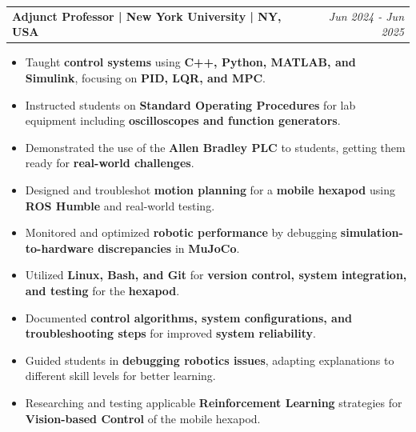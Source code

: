 \documentclass[a4paper,11pt]{article}
\makeatletter
\newcommand{\resumeExp}[2]{
\vspace{0mm}\item[]
    \begin{tabular*}{\textwidth}[t]{l@{\extracolsep{\fill}}r}
        \hspace{-4.4mm} \small\textbf{#1} & {\footnotesize{#2}} \vspace{-1.2mm} %
    \end{tabular*}
    \vspace*{-7mm}
}
\newcommand{\resumeItemListStart}{\begin{justify}\begin{itemize}[leftmargin=1.5ex, rightmargin=2ex, noitemsep,labelsep=1.2mm,itemsep=1mm]\small}
\newcommand{\resumeItemListEnd}{\end{itemize}\end{justify}}%
\makeatother
\begin{document}
\resumeExp
{Adjunct Professor\textnormal{ | New York University | NY, USA}}
{\textit{Jun 2024 - Jun 2025}}
\resumeItemListStart
\item[$\bullet$] Taught \textbf{control systems} using \textbf{C++, Python, MATLAB, and Simulink}, focusing on \textbf{PID, LQR, and MPC}.
\item[$\bullet$] Instructed students on \textbf{Standard Operating Procedures} for lab equipment including \textbf{oscilloscopes and function generators}.
\item[$\bullet$] Demonstrated the use of the \textbf{Allen Bradley PLC} to students, getting them ready for \textbf{real-world challenges}.
\item[$\bullet$] Designed and troubleshot \textbf{motion planning} for a \textbf{mobile hexapod} using \textbf{ROS Humble} and real-world testing.
\item[$\bullet$] Monitored and optimized \textbf{robotic performance} by debugging \textbf{simulation-to-hardware discrepancies} in \textbf{MuJoCo}.
\item[$\bullet$] Utilized \textbf{Linux, Bash, and Git} for \textbf{version control, system integration, and testing} for the \textbf{hexapod}.
\item[$\bullet$] Documented \textbf{control algorithms, system configurations, and troubleshooting steps} for improved \textbf{system reliability}.
\item[$\bullet$] Guided students in \textbf{debugging robotics issues}, adapting explanations to different skill levels for better learning.
\item[$\bullet$] Researching and testing applicable \textbf{Reinforcement Learning} strategies for \textbf{Vision-based Control} of the mobile hexapod.
\resumeItemListEnd
\end{document}
